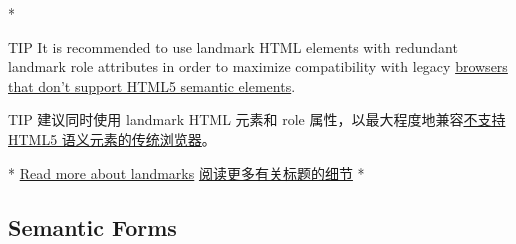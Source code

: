 \begin{paracol}{2} 
 
\switchcolumn[0]*%
\begin{vueQuote}{TIP}
It is recommended to use landmark HTML elements with redundant landmark
role attributes in order to maximize compatibility with legacy
\href{https://caniuse.com/\#feat=html5semantic}{browsers that don't
support HTML5 semantic elements}.
\end{vueQuote} 
\switchcolumn
\begin{vueQuote}{TIP}
建议同时使用 landmark HTML 元素和 role
属性，以最大程度地兼容\href{https://caniuse.com/\#feat=html5semantic}{不支持
HTML5 语义元素的传统浏览器}。
\end{vueQuote} 
\switchcolumn[0]*%
\href{https://www.w3.org/TR/wai-aria-1.2/\#landmark_roles}{Read more
about landmarks}
\switchcolumn
\href{https://www.w3.org/TR/wai-aria-1.2/\#landmark_roles}{阅读更多有关标题的细节}
\switchcolumn[0]*%
\subsection{Semantic Forms}
\switchcolumn

\end{paracol}
